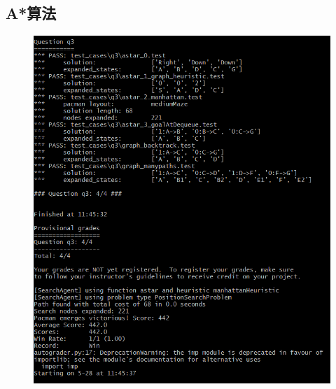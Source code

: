 \documentclass{ctexart}
\begin{document}
\subsection{\hei A*算法}
\begin{figure}[H]	
	\centering	
	\includegraphics[scale=0.6]{ax.png}
		
\end{figure}
\end{document}
